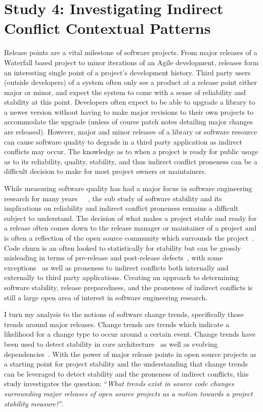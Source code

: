 \section{Study 4: Investigating Indirect Conflict Contextual Patterns}
\label{study:apie}

Release points are a vital milestone of software projects. From major releases of a Waterfall based project to minor iterations of an Agile development,
releases form an interesting single point of a project's development history.
Third party users (outside developers) of a system often only see a product at a release point either major or minor,
and expect the system to come with a sense of reliability and stability at this point. Developers often expect to be able to upgrade a library to
a newer version without having to make major revisions to their own projects to accommodate the upgrade (unless of course patch notes detailing major
changes are released). However, major and minor releases of a library or software resource can cause software quality to degrade in
a third party application as indirect conflicts may occur. The knowledge as to when a project is ready for public usage
as to its reliability, quality, stability, and thus indirect conflict proneness can be a difficult decision to make for most project owners or maintainers.

While measuring software quality has had a major focus in software engineering research for many years~\cite{Bowen:1978:CAS}~\cite{Grady:1993:PRM}~\cite{ISOIEC9126},
the sub study of software stability and its implications on reliability and indirect conflict proneness remains a difficult subject to understand. 
The decision of what makes a project stable and ready
for a release often comes down to the release manager or maintainer of a project and is often a reflection of the open source community which surrounds 
the project~\cite{Conway:1968}. Code churn is an often looked to statistically for stability but can be grossly misleading
in terms of pre-release and post-release defects~\cite{Fenton:2000:QAF}, with some exceptions~\cite{Nagappan:2005:URC} as well as proneness to indirect conflicts
both internally and externally to third party applications. 
Creating an approach to determining software stability, release preparedness, and the proneness of indirect conflicts is still a large open area of
interest in software engineering research.

I turn my analysis to the notions of software change trends, specifically those trends around major releases. Change trends are trends which indicate
a likelihood for a change type to occur around a certain event. Change trends have been used to detect
stability in core architecture~\cite{Wermelinger:2008:AEE} as well as evolving dependencies~\cite{Businge:2010:ESE}.
With the power of major release points in open source projects as a starting point for project stability and the understanding that change trends can
be leveraged to detect stability and the proneness of indirect conflicts, this study investigates the question:
``\textit{What trends exist in source code changes surrounding major releases of open source projects as a notion towards a project
stability measure?}''.

